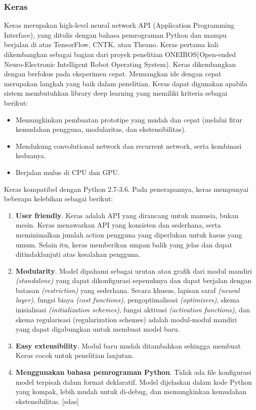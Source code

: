 \documentclass[../thesis.tex]{subfiles}
\begin{document}
\subsubsection{Keras}
Keras merupakan high-level neural network API (Application Programming Interface), yang ditulis dengan bahasa pemrograman Python dan mampu berjalan di atas TensorFlow, CNTK, atau
Theano. Keras pertama kali dikembangkan sebagai bagian dari proyek penelitian ONEIROS(Open-ended Neuro-Electronic Intelligent Robot Operating System). Keras dikembangkan dengan
berfokus pada eksperimen cepat. Menuangkan ide dengan cepat merupakan langkah yang baik dalam penelitian. Keras dapat digunakan apabila sistem membutuhkan library deep learning yang
memiliki kriteria sebagai berikut:
\begin{itemize}
	\item Memungkinkan pembuatan prototipe yang mudah dan cepat (melalui fitur kemudahan pengguna, modularitas, dan ekstensibilitas).
	\item Mendukung convolutional network dan recurrent network, serta kombinasi keduanya.
	\item Berjalan mulus di CPU dan GPU.
  \end{itemize}

Keras kompatibel dengan Python 2.7-3.6. Pada penerapannya, keras mempunyai beberapa
kelebihan sebagai berikut:
\begin{enumerate}
	\item \textbf{User friendly}. Keras adalah API yang dirancang untuk manusia, bukan mesin. Keras menawarkan API yang konsisten dan sederhana, serta meminimalkan jumlah action
	pengguna yang diperlukan untuk kasus yang umum. Selain itu, keras memberikan umpan balik yang jelas dan dapat ditindaklanjuti atas kesalahan pengguna.
	\item \textbf{Modularity}. Model dipahami sebagai urutan atau grafik dari modul mandiri \textit{(standalone)}
	yang dapat dikonfigurasi sepenuhnya dan dapat berjalan dengan batasan \textit{(restriction)} yang sederhana. Secara khusus, lapisan saraf \textit{(neural layer)}, fungsi biaya \textit{(cost functions)}, pengoptimalisasi \textit{(optimizers)}, skema inisialisasi \textit{(initialization schemes)}, fungsi aktivasi
	\textit{(activation functions)}, dan skema regularisasi (regularization schemes) adalah modul-modul mandiri yang dapat digabungkan untuk membuat model baru.
	\item \textbf{Easy extensibility}. Modul baru mudah ditambahkan sehingga membuat Keras cocok untuk penelitian lanjutan.
	\item \textbf{Menggunakan bahasa pemrograman Python}. Tidak ada file konfigurasi model
	terpisah dalam format deklaratif. Model dijelaskan dalam kode Python yang kompak,
	lebih mudah untuk di-debug, dan memungkinkan kemudahan ekstensibilitas. [sdas]
\end{enumerate}
\end{document}
